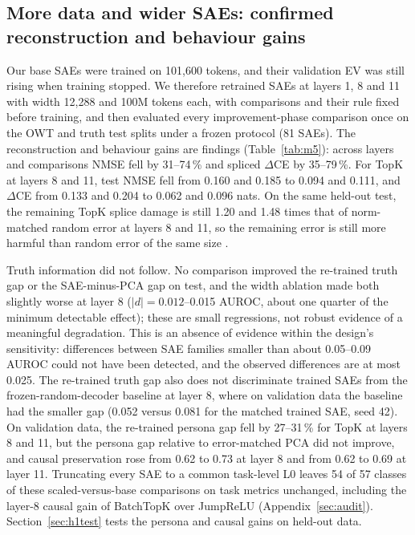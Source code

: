 \subsection{More data and wider SAEs: confirmed reconstruction and behaviour gains}\label{sec:r2}

Our base SAEs were trained on 101{,}600 tokens, and their validation EV was still rising when training stopped. We
therefore retrained SAEs at layers 1, 8 and 11 with width 12{,}288 and 100M tokens each, with comparisons and their rule
fixed before training, and then evaluated every improvement-phase comparison once on the OWT and truth test splits
under a frozen protocol (81 SAEs). The reconstruction and behaviour gains are  findings
(Table~\ref{tab:m5}): across layers and comparisons NMSE fell by 31--74\,\% and spliced $\Delta$CE by 35--79\,\%. For
TopK at layers 8 and 11, test NMSE fell from 0.160 and 0.185 to 0.094 and 0.111, and $\Delta$CE from 0.133 and 0.204
to 0.062 and 0.096 nats. On the same held-out test, the remaining TopK splice damage is still 1.20 and 1.48 times
that of norm-matched random error at layers 8 and 11, so the remaining error is still more harmful than random error
of the same size \citep{engels2024darkmatter}.

Truth information did not follow. No comparison improved the re-trained truth gap or the SAE-minus-PCA gap on test,
and the width ablation made both slightly worse at layer 8 ($|d|=0.012$--0.015 AUROC, about one quarter of the
minimum detectable effect); these are small regressions, not robust evidence of a meaningful degradation. This is an
absence of evidence within the design's sensitivity: differences between SAE families smaller than about 0.05--0.09
AUROC could not have been detected, and the observed differences are at most 0.025. The re-trained truth gap also does
not discriminate trained SAEs from the frozen-random-decoder baseline at layer 8, where on validation data the baseline
had the smaller gap (0.052 versus 0.081 for the matched trained SAE, seed 42). On validation data, the re-trained
persona gap fell by 27--31\,\% for TopK at layers 8 and 11, but the persona gap relative to error-matched PCA did not
improve, and causal preservation rose from 0.62 to 0.73 at layer 8 and from 0.62 to 0.69 at layer 11. Truncating
every SAE to a common task-level L0 leaves 54 of 57 classes of these scaled-versus-base comparisons on task metrics
unchanged, including the layer-8 causal gain of BatchTopK over JumpReLU (Appendix~\ref{sec:audit}).
Section~\ref{sec:h1test} tests the persona and causal gains on held-out data.

